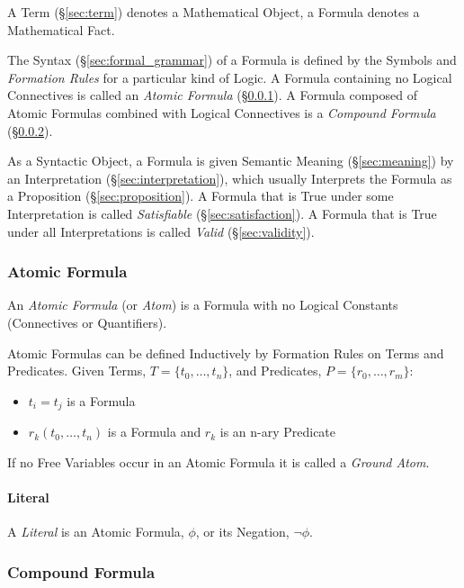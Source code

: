 A Term (\S\ref{sec:term}) denotes a Mathematical Object, a Formula
denotes a Mathematical Fact.

The Syntax (\S\ref{sec:formal_grammar}) of a Formula is defined by the
Symbols and \emph{Formation Rules} for a particular kind of Logic. A
Formula containing no Logical Connectives is called an \emph{Atomic
  Formula} (\S\ref{sec:atomic_formula}). A Formula composed of Atomic
Formulas combined with Logical Connectives is a \emph{Compound
  Formula} (\S\ref{sec:compound_formula}).

As a Syntactic Object, a Formula is given Semantic Meaning
(\S\ref{sec:meaning}) by an Interpretation
(\S\ref{sec:interpretation}), which usually Interprets the Formula as
a Proposition (\S\ref{sec:proposition}). A Formula that is True under
some Interpretation is called \emph{Satisfiable}
(\S\ref{sec:satisfaction}). A Formula that is True under all
Interpretations is called \emph{Valid} (\S\ref{sec:validity}).



\subsubsection{Atomic Formula}\label{sec:atomic_formula}

An \emph{Atomic Formula} (or \emph{Atom}) is a Formula with no Logical
Constants (Connectives or Quantifiers).

Atomic Formulas can be defined Inductively by Formation Rules on Terms
and Predicates. Given Terms, $T = \{t_0,\ldots,t_n\}$, and Predicates,
$P = \{r_0,\ldots,r_m\}$:
\begin{itemize}
  \item $t_i = t_j$ is a Formula
  \item $r_k(t_0,\ldots,t_n)$ is a Formula and $r_k$ is an n-ary
    Predicate
\end{itemize}
If no Free Variables occur in an Atomic Formula it is called a
\emph{Ground Atom}.



\paragraph{Literal}\label{sec:literal}\hfill

A \emph{Literal} is an Atomic Formula, $\phi$, or its Negation, $\neg
\phi$.



\subsubsection{Compound Formula}\label{sec:compound_formula}

